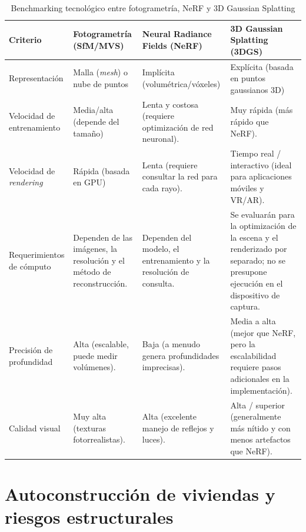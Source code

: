 \documentclass[12pt,oneside]{report}
\begin{document}
\begin{table}[htbp]
  \centering
  \caption{Benchmarking tecnológico entre fotogrametría, NeRF y 3D Gaussian Splatting}
  \label{tab:benchmarking-tecnologico}
  \scriptsize
  \setlength{\tabcolsep}{3pt}
  \renewcommand{\arraystretch}{1.15}
  \begin{tabular}{>{\raggedright\arraybackslash}p{} >{\raggedright\arraybackslash}p{} >{\raggedright\arraybackslash}p{} >{\raggedright\arraybackslash}p{}}
    \toprule
    \textbf{Criterio} & \textbf{Fotogrametría (SfM/MVS)} & \textbf{Neural Radiance Fields (NeRF)} & \textbf{3D Gaussian Splatting (3DGS)} \\
    \midrule
    Representación & Malla (\textit{mesh}) o nube de puntos & Implícita (volumétrica/vóxeles) & Explícita (basada en puntos gaussianos 3D) \\
    Velocidad de entrenamiento & Media/alta (depende del tamaño) & Lenta y costosa (requiere optimización de red neuronal). & Muy rápida (más rápido que NeRF). \\
    Velocidad de \textit{rendering} & Rápida (basada en GPU) & Lenta (requiere consultar la red para cada rayo). & Tiempo real / interactivo (ideal para aplicaciones móviles y VR/AR). \\
    Requerimientos de cómputo & Dependen de las imágenes, la resolución y el método de reconstrucción. & Dependen del modelo, el entrenamiento y la resolución de consulta. & Se evaluarán para la optimización de la escena y el renderizado por separado; no se presupone ejecución en el dispositivo de captura. \\
    Precisión de profundidad & Alta (escalable, puede medir volúmenes). & Baja (a menudo genera profundidades imprecisas). & Media a alta (mejor que NeRF, pero la escalabilidad requiere pasos adicionales en la implementación). \\
    Calidad visual & Muy alta (texturas fotorrealistas). & Alta (excelente manejo de reflejos y luces). & Alta / superior (generalmente más nítido y con menos artefactos que NeRF). \\
    \bottomrule
  \end{tabular}
\end{table}

\section{Autoconstrucción de viviendas y riesgos estructurales}
\end{document}
